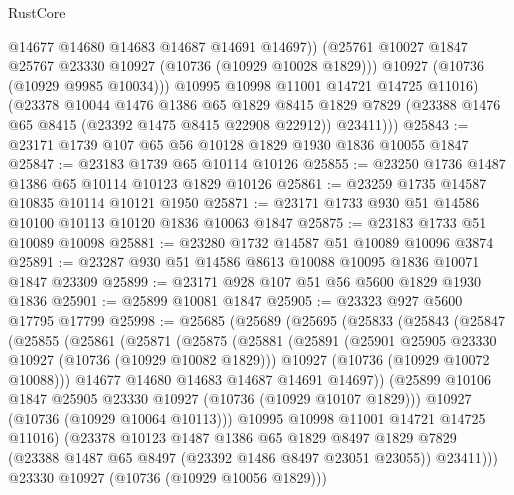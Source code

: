 \begin{lexlean}{RustCore}
\begin{coremodule}
                @14677
                @14680
                @14683
                @14687
                @14691
                @14697))
            (@25761 @10027 @1847 @25767 @23330 @10927 (@10736 (@10929 @10028 @1829)))
            @10927
            (@10736 (@10929 @9985 @10034)))
          @10995
          @10998
          @11001
          @14721
          @14725
          @11016)
        (@23378
          @10044
          @1476
          @1386
          @65
          @1829
          @8415
          @1829
          @7829
          (@23388 @1476 @65 @8415 (@23392 @1475 @8415 @22908 @22912))
          @23411)))
@25843 := @23171 @1739 @107 @65 @56 @10128 @1829 @1930 @1836 @10055 @1847
@25847 := @23183 @1739 @65 @10114 @10126
@25855 := @23250 @1736 @1487 @1386 @65 @10114 @10123 @1829 @10126
@25861 := @23259 @1735 @14587 @10835 @10114 @10121 @1950
@25871 := @23171 @1733 @930 @51 @14586 @10100 @10113 @10120 @1836 @10063 @1847
@25875 := @23183 @1733 @51 @10089 @10098
@25881 := @23280 @1732 @14587 @51 @10089 @10096 @3874
@25891 := @23287 @930 @51 @14586 @8613 @10088 @10095 @1836 @10071 @1847 @23309
@25899 := @23171 @928 @107 @51 @56 @5600 @1829 @1930 @1836
@25901 := @25899 @10081 @1847
@25905 := @23323 @927 @5600 @17795 @17799
@25998 := @25685
    (@25689
      (@25695
        (@25833
          (@25843
            (@25847
              (@25855
                (@25861
                  (@25871
                    (@25875
                      (@25881
                        (@25891
                          (@25901 @25905 @23330 @10927 (@10736 (@10929 @10082 @1829)))
                          @10927
                          (@10736 (@10929 @10072 @10088)))
                        @14677
                        @14680
                        @14683
                        @14687
                        @14691
                        @14697))
                    (@25899 @10106 @1847 @25905 @23330 @10927 (@10736 (@10929 @10107 @1829)))
                    @10927
                    (@10736 (@10929 @10064 @10113)))
                  @10995
                  @10998
                  @11001
                  @14721
                  @14725
                  @11016)
                (@23378
                  @10123
                  @1487
                  @1386
                  @65
                  @1829
                  @8497
                  @1829
                  @7829
                  (@23388 @1487 @65 @8497 (@23392 @1486 @8497 @23051 @23055))
                  @23411)))
            @23330
            @10927
            (@10736 (@10929 @10056 @1829)))

\end{coremodule}
\end{lexlean}
